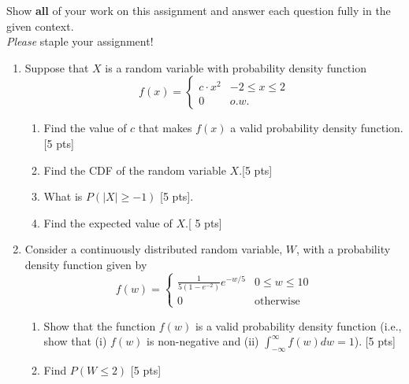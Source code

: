 \documentclass[11pt]{article}\usepackage[]{graphicx}\usepackage[]{color}
\begin{document}

\pagestyle{fancy} 

Show \textbf{all} of your work on this assignment and answer each question fully in the given context. \\


\emph{Please} staple your assignment!

\begin{enumerate}
	

	
	\item Suppose that $X$ is a random variable with probability density function $$ f(x) = \begin{cases} c \cdot x^2 & - 2 \le x \le 2 \\ 0 & o.w. \end{cases} $$
 
        \begin{enumerate}
               \item Find the value of $c$ that makes $f(x)$ a valid probability density function.[5 pts]
               
                \item Find the CDF of the random variable $X$.[5 pts]
                
                \item What is $P(\vert{X}\vert \ge {-1})$ [5 pts].
                
                \item Find the expected value of $X$.[ 5 pts]
                
        \end{enumerate}      
    	
	\item  Consider a continuously distributed random variable, $W$, with a probability density function given by 
	$$ f(w) = \begin{cases} \frac{1}{5(1 - e^{-2})} e^{-w/5} & 0 \le w \le 10 \\ 0 & \text{otherwise} \end{cases} $$
	
	    \begin{enumerate}
                  \item  Show that the function $f(w)$ is a valid probability density function (i.e., show that (i) $f(w)$ is non-negative and (ii) $\int_{-\infty}^{\infty} f(w) dw = 1$). [5 pts]
                   \item Find $P(W \le 2)$ [5 pts]
                   

\end{enumerate}
\end{enumerate}
\end{document}
